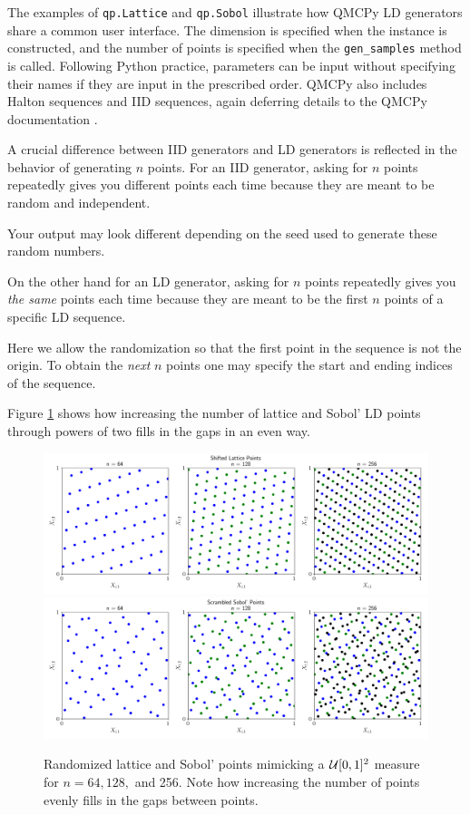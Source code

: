 \documentclass[graybox,footinfo]{svmult}
\begin{document}
The examples of \texttt{qp.Lattice} and \texttt{qp.Sobol} illustrate how QMCPy LD generators share a common user interface.  The dimension is specified when the instance is constructed, and the number of points is specified when the \texttt{gen\_samples} method is called.  Following Python practice, parameters can be input without specifying their names if they are input in the prescribed order.  QMCPy also includes Halton sequences and IID sequences, again deferring details to the QMCPy documentation \cite{QMCPyDocs}.

A crucial difference between IID generators and LD generators is reflected in the behavior of generating $n$ points.  For an IID generator, asking for $n$ points repeatedly gives you different points each time because they are meant to be random and independent.

Your output may look different depending on the seed used to generate these random numbers.

On the other hand for an LD generator, asking for $n$ points repeatedly gives you \emph{the same} points each time because they are meant to be the first $n$ points of a specific LD sequence.  

Here we allow the randomization so that the first point in the sequence is not the origin.  To obtain the \emph{next} $n$ points one may specify the start and ending indices of the sequence.


Figure \ref{fig:increase_n} shows how increasing the number of lattice and Sobol' LD points through powers of two fills in the gaps in an even way.

\begin{figure}[t]
	\includegraphics[width=1\textwidth]{QMCSoftwareArticle/figs/dd_lattice_successive.png}
	\qquad
	\includegraphics[width=1\textwidth]{QMCSoftwareArticle/figs/dd_sobol_successive.png}
	\caption{Randomized lattice and Sobol' points mimicking a ${\mathcal{U}}[0,1]^2$ measure for $n = 64, 128,$ and 256. Note how increasing the number of points evenly fills in the gaps between points.}
	\label{fig:increase_n}
\end{figure}
\end{document}
